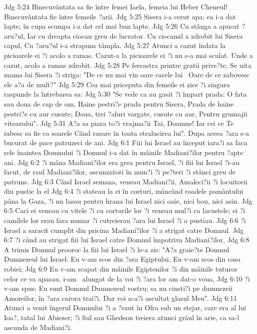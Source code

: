 Jdg 5:24  Binecuvântata sa fie între femei Iaela, femeia lui Heber Cheneul! Binecuvântata fie între femeile ?arii.
Jdg 5:25  Sisera i-a cerut apa; ea i-a dat lapte; în cupa scumpa i-a dat cel mai bun lapte.
Jdg 5:26  Cu stânga a apucat ?aru?ul, Iar cu dreapta ciocan greu de lucrator. Cu ciocanul a zdrobit lui Sisera capul, Cu ?aru?ul i-a strapuns tâmpla.
Jdg 5:27  Atunci a cazut îndata la picioarele ei ?i acolo a ramas. Cazut-a la picioarele ei ?i nu s-a mai sculat. Unde a cazut, acolo a ramas zdrobit.
Jdg 5:28  Pe fereastra printre gratii prive?te, Se uita mama lui Sisera ?i striga: "De ce nu mai vin oare carele lui  Oare de ce zabovesc ele a?a de mult?"
Jdg 5:29  Cea mai priceputa din femeile ei zice ?i singura raspunde la întrebarea sa:
Jdg 5:30  "Se vede ca au gasit ?i împart prada: O fata sau doua de cap de om, Haine pestri?e prada pentru Sisera, Prada de haine pestri?e cu aur cusute; Doua, trei ?aluri vargate, cusute cu aur, Pentru grumajii viteazului".
Jdg 5:31  A?a sa piara to?i vrajma?ii Tai, Doamne! Iar cei ce Te iubesc sa fie ca soarele Când rasare în toata stralucirea lui". Dupa aceea ?ara s-a bucurat de pace patruzeci de ani.
Jdg 6:1  Fiii lui Israel au început iara?i sa faca rele înaintea Domnului ?i Domnul i-a dat în mâinile Madiani?ilor pentru ?apte ani.
Jdg 6:2  ?i mâna Madiani?ilor era grea pentru Israel, ?i fiii lui Israel ?i-au facut, de raul Madiani?ilor, ascunzatori în mun?i ?i pe?teri ?i stânci greu de patruns.
Jdg 6:3  Când Israel semana, veneau Madiani?ii, Amaleci?ii ?i locuitorii din pustie la el
Jdg 6:4  ?i stateau la ei în corturi, mâncând roadele pamântului pâna la Gaza, ?i nu lasau pentru hrana lui Israel nici oaie, nici bou, nici asin.
Jdg 6:5  Caci ei veneau cu vitele ?i cu corturile lor ?i veneau mul?i ca lacustele; ei ?i camilele lor erau fara numar ?i cutreierau ?ara lui Israel ?i o pustiau.
Jdg 6:6  ?i Israel a saracit cumplit din pricina Madiani?ilor ?i a strigat catre Domnul.
Jdg 6:7  ?i când au strigat fiii lui Israel catre Domnul împotriva Madiani?ilor,
Jdg 6:8  A trimis Domnul prooroc la fiii lui Israel ?i le-a zis: "A?a graie?te Domnul Dumnezeul lui Israel: Eu v-am scos din ?ara Egiptului, Eu v-am scos din casa robiei;
Jdg 6:9  Eu v-am scapat din mâinile Egiptenilor ?i din mâinile tuturor celor ce va apasau, i-am  alungat de la voi ?i ?ara lor am dat-o voua,
Jdg 6:10  ?i v-am spus: Eu sunt Domnul Dumnezeul vostru; sa nu cinsti?i pe dumnezeii Amoreilor, în ?ara carora trai?i. Dar voi n-a?i ascultat glasul Meu".
Jdg 6:11  Atunci a venit îngerul Domnului ?i a ?ezut în Ofra sub un stejar, care era al lui Ioa?, tatal lui Abiezer; ?i fiul sau Ghedeon treiera atunci grâul în arie, ca sa-l ascunda de Madiani?i.
